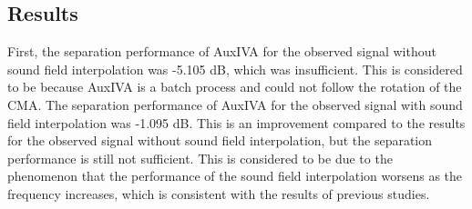 \documentclass{article}
\begin{document}
\subsection{Results}
First, the separation performance of AuxIVA for the observed signal without sound field interpolation was -5.105 dB, which was insufficient.
This is considered to be because AuxIVA is a batch process and could not follow the rotation of the CMA.
The separation performance of AuxIVA for the observed signal with sound field interpolation was -1.095 dB.
This is an improvement compared to the results for the observed signal without sound field interpolation, but the separation performance is still not sufficient.
This is considered to be due to the phenomenon that the performance of the sound field interpolation worsens as the frequency increases, which is consistent with the results of previous studies.

\end{document}
